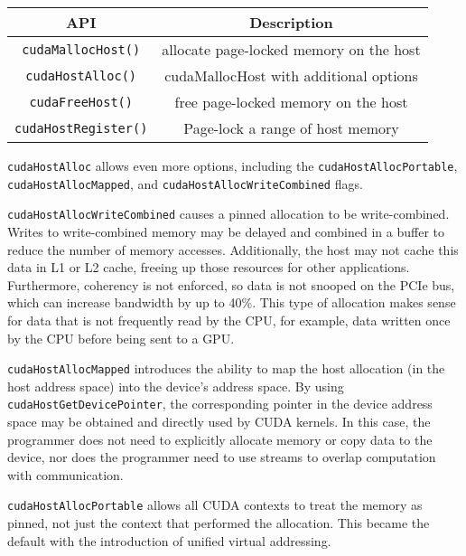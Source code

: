 \begin{table}[h]
	\centering
	\caption[CUDA Pinned Memory-Management APIs]{}
	\label{tab:cuda-pinned-apis}
	\begin{tabular}{|c|c|}
		\hline
		\textbf{API}                & \textbf{Description}                    \\ \hline
		\texttt{cudaMallocHost()}   & allocate page-locked memory on the host \\ \hline
		\texttt{cudaHostAlloc()}    & cudaMallocHost with additional options  \\ \hline
		\texttt{cudaFreeHost()}     & free page-locked memory on the host     \\ \hline
		\texttt{cudaHostRegister()} & Page-lock a range of host memory        \\ \hline
	\end{tabular}
\end{table}

\texttt{cudaHostAlloc} allows even more options, including the \texttt{cudaHostAllocPortable}, \texttt{cudaHostAllocMapped}, and \texttt{cudaHostAllocWriteCombined} flags.

\texttt{cudaHostAllocWriteCombined} causes a pinned allocation to be write-combined.
Writes to write-combined memory may be delayed and combined in a buffer to reduce the number of memory accesses.
Additionally, the host may not cache this data in L1 or L2 cache, freeing up those resources for other applications. 
Furthermore, coherency is not enforced, so data is not snooped on the PCIe bus, which can increase bandwidth by up to 40\%.
This type of allocation makes sense for data that is not frequently read by the CPU, for example, data written once by the CPU before being sent to a GPU.

\texttt{cudaHostAllocMapped} introduces the ability to map the host allocation (in the host address space) into the device's address space.
By using \texttt{cudaHostGetDevicePointer}, the corresponding pointer in the device address space may be obtained and directly used by CUDA kernels.
In this case, the programmer does not need to explicitly allocate memory or copy data to the device, nor does the programmer need to use streams to overlap computation with communication.

\texttt{cudaHostAllocPortable} allows all CUDA contexts to treat the memory as pinned, not just the context that performed the allocation.
This became the default with the introduction of unified virtual addressing. 

